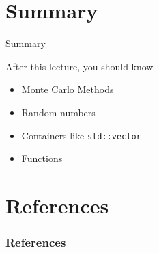 \documentclass[\classoption]{beamer}
\begin{document}
\section{Summary}

\begin{frame}{Summary}
\begin{block}{After this lecture, you should know}
\begin{itemize}
\item Monte Carlo Methods
\item Random numbers
\item Containers like \lstinline|std::vector|
\item Functions
\end{itemize}
\end{block}


\end{frame}

\section{References}

\begin{frame}[t, allowframebreaks]
\frametitle{References}


\end{frame}
\end{document}
